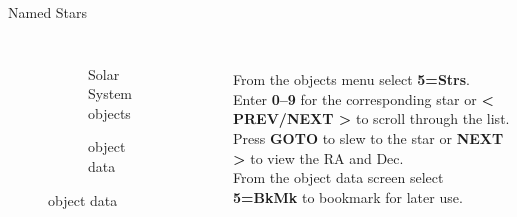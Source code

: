 \begin{frame}[t]{Named Stars}
  \begin{columns}[T]
    \begin{figure}[ht]
        \begin{subfigure}{0.67\textwidth}
        \caption{Solar System objects}
      \end{subfigure}
      \vspace{\fill}
      \begin{subfigure}{0.67\textwidth}
        \caption{object data}
      \end{subfigure}
    \end{figure}
  \large
  \ \\[0.25ex]
  From the objects menu select \textbf{5=Strs}.\\[1ex]

  Enter \textbf{0--9} for the corresponding star or \textbf{\textless
  PREV/NEXT \textgreater} to scroll through the list. \\[1ex]

  Press \textbf{GOTO} to slew to the star or \textbf{NEXT \textgreater} to
  view the RA and Dec. \\[1ex]

  From the object data screen select \textbf{5=BkMk} to bookmark for later
  use.

\end{columns}
\end{frame}


